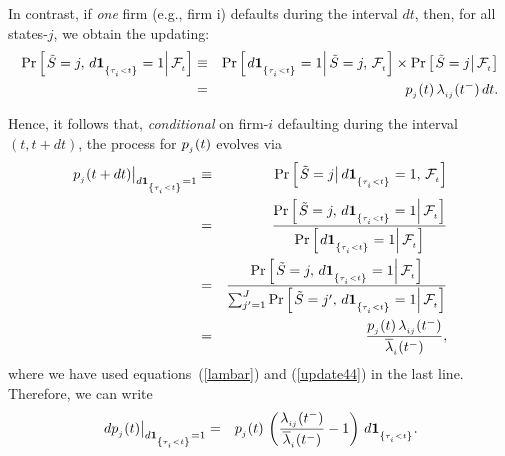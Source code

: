 \documentclass[titlepage,11pt]{article}
\def\by{\begin{eqnarray}}
\def\ey{\end{eqnarray}}
\begin{document}
In contrast, if {\em one} firm (e.g., firm i) defaults during the
interval $dt$, then, for all states-$j$, we obtain the updating: \by
\Pr \left[ \left. \tilde{S} = j, \, d\ind{\tau\sub{i} < t}=1 \right|
\F\sub{t} \right] &\equiv& \Pr \left[ \left.  d\ind{\tau\sub{i} <
t}=1 \right| \tilde{S} = j, \, \F\sub{t} \right] \times \Pr \left[
\left. \tilde{S} = j \right| \F\sub{t} \right]
\nonumber \\
%
\label{update44} &=& p\sub{j}(t) \, \lambda\sub{ij}(t^{-}) \,dt. \ey

Hence, it follows that, {\em conditional} on firm-$i$ defaulting
during the interval $(t, t + dt)$, the process for $p_{_{{j}}}(t)$
evolves via \by \left. p\sub{j}(t+dt)\right|_{d\ind{\tau\sub{i} <
t}=1} &\equiv& \Pr \left[ \left.  \tilde{S} = j \right|
d\ind{\tau\sub{i} < t}=1 , \, \F\sub{t}\right]
\nonumber \\
%
&=& \frac{\Pr \left[ \left. \tilde{S} = j, \, d\ind{\tau\sub{i} <
t}=1 \right| \F\sub{t} \right]} {\Pr \left[ \left. d\ind{\tau\sub{i}
< t}=1 \right| \F\sub{t} \right]}
\nonumber \\
%
&=& \frac{\Pr \left[ \left. \tilde{S} = j, \, d\ind{\tau\sub{i} <
t}=1 \right| \F\sub{t} \right]} {\sum_{j'=1}^{J} \Pr \left[ \left.
\tilde{S} = j', \, d\ind{\tau\sub{i} < t}=1
\right| \F\sub{t} \right]} \nonumber \\
%
&=& \frac{p\sub{j}(t) \, \lambda\sub{ij}(t^{-}) }
{\overline{\lambda}\sub{i}(t^{-})}, \ey where we have used
equations~(\ref{lambar}) and (\ref{update44}) in the last line.
Therefore, we can write \by \label{def2} \left.
dp\sub{j}(t)\right|_{d\ind{\tau\sub{i} < t}=1} &=& p\sub{j}(t) \,
\left(
\frac{\lambda\sub{ij}(t^{-})}{\overline{\lambda}\sub{i}(t^{-})} - 1
\right) \, d\ind{\tau\sub{i} < t}. \ey
\end{document}
